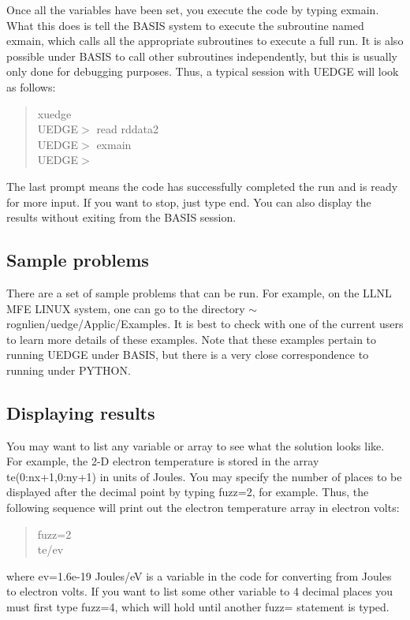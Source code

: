 \documentclass [12pt]{article}
\def\tild{$\sim$}
\begin{document}
Once all the variables have been set, you execute the code by typing {\sf
  exmain}.  What this does is tell the {\sf BASIS} system to execute the
subroutine named {\sf exmain}, which calls all the appropriate subroutines to
execute a full run.  It is also possible under {\sf BASIS} to call other
subroutines independently, but this is usually only done for debugging
purposes.  Thus, a typical session with {\sf UEDGE} will look as follows:
\begin{verse} \sf
xuedge\\
UEDGE$>$ read rddata2\\
UEDGE$>$ exmain\\
UEDGE$>$
\end{verse}
The last prompt means the code has successfully completed the run and is ready
for more input.  If you want to stop, just type {\sf end}.  You can also
display the results without exiting from the {\sf BASIS} session.
 

\subsection{Sample problems}

There are a set of sample problems that can be run.  For example, on the LLNL
MFE LINUX system, one can go to the directory {\sf
  \tild rognlien/uedge/Applic/Examples}.  It is best to check with one of the
current users to learn more details of these examples.  Note that these examples
pertain to running {\sf UEDGE} under {\sf BASIS}, but there is a very close
correspondence to running under {\sf PYTHON}.
 
\subsection{Displaying results}

You may want to list any variable or array to see what the solution looks
like.  For example, the 2-D electron temperature is stored in the array {\sf
  te(0:nx+1,0:ny+1)} in units of Joules.  You may specify the number of places
to be displayed after the decimal point by typing {\sf fuzz=2}, for example.
Thus, the following sequence will print out the electron temperature array in
electron volts:
\begin{verse} \sf
fuzz=2\\
te/ev
\end{verse}
where ev=1.6e-19 Joules/eV is a variable in the code for converting from
Joules to electron volts.  If you want to list some other variable to 4
decimal places you must first type {\sf fuzz=4}, which will hold until another
{\sf fuzz=} statement is typed.
\end{document}
